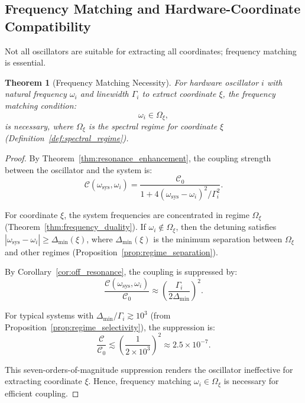 \documentclass[twocolumn,10pt,a4paper]{article}
\newtheorem{theorem}{Theorem}[section]
\theoremstyle{remark}
\begin{document}
\subsection{Frequency Matching and Hardware-Coordinate Compatibility}

Not all oscillators are suitable for extracting all coordinates; frequency matching is essential.

\begin{theorem}[Frequency Matching Necessity]
\label{thm:frequency_matching}
For hardware oscillator $i$ with natural frequency $\omega_i$ and linewidth $\Gamma_i$ to extract coordinate $\xi$, the \emph{frequency matching condition}:
\begin{equation}
\omega_i \in \Omega_\xi,
\end{equation}
is necessary, where $\Omega_\xi$ is the spectral regime for coordinate $\xi$ (Definition~\ref{def:spectral_regime}).
\end{theorem}

\begin{proof}
By Theorem~\ref{thm:resonance_enhancement}, the coupling strength between the oscillator and the system is:
\begin{equation}
\mathcal{C}(\omega_{\text{sys}}, \omega_i) = \frac{\mathcal{C}_0}{1 + 4(\omega_{\text{sys}} - \omega_i)^2 / \Gamma_i^2}.
\end{equation}

For coordinate $\xi$, the system frequencies are concentrated in regime $\Omega_\xi$ (Theorem~\ref{thm:frequency_duality}). If $\omega_i \notin \Omega_\xi$, then the detuning satisfies $|\omega_{\text{sys}} - \omega_i| \geq \Delta_{\min}(\xi)$, where $\Delta_{\min}(\xi)$ is the minimum separation between $\Omega_\xi$ and other regimes (Proposition~\ref{prop:regime_separation}).

By Corollary~\ref{cor:off_resonance}, the coupling is suppressed by:
\begin{equation}
\frac{\mathcal{C}(\omega_{\text{sys}}, \omega_i)}{\mathcal{C}_0} \approx \left(\frac{\Gamma_i}{2\Delta_{\min}}\right)^2.
\end{equation}

For typical systems with $\Delta_{\min}/\Gamma_i \gtrsim 10^3$ (from Proposition~\ref{prop:regime_selectivity}), the suppression is:
\begin{equation}
\frac{\mathcal{C}}{\mathcal{C}_0} \lesssim \left(\frac{1}{2 \times 10^3}\right)^2 \approx 2.5 \times 10^{-7}.
\end{equation}

This seven-orders-of-magnitude suppression renders the oscillator ineffective for extracting coordinate $\xi$. Hence, frequency matching $\omega_i \in \Omega_\xi$ is necessary for efficient coupling.
\end{proof}
\end{document}

